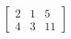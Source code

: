 \documentclass[preview]{standalone}
\begin{document}
\begin{align*}
\left[\begin{array}{cc|c} 2 & 1 & 5 \\ 4 & 3 & 11 \end{array}\right]
\end{align*}
\end{document}
